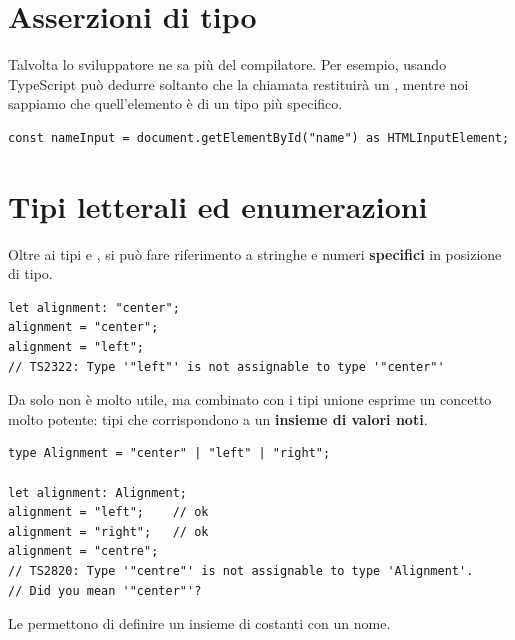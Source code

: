 \section{Asserzioni di tipo}

Talvolta lo sviluppatore ne sa più del compilatore. Per esempio, usando
 TypeScript può dedurre soltanto che la chiamata
restituirà un , mentre noi sappiamo che quell'elemento è di un
tipo più specifico.

\begin{lstlisting}[style=ts]
const nameInput = document.getElementById("name") as HTMLInputElement;
\end{lstlisting}


\section{Tipi letterali ed enumerazioni}

Oltre ai tipi  e , si può fare riferimento a stringhe
e numeri \textbf{specifici} in posizione di tipo.

\begin{lstlisting}[style=ts]
let alignment: "center";
alignment = "center";
alignment = "left";
// TS2322: Type '"left"' is not assignable to type '"center"'
\end{lstlisting}

Da solo non è molto utile, ma combinato con i tipi unione esprime un concetto
molto potente: tipi che corrispondono a un \textbf{insieme di valori noti}.

\begin{lstlisting}[style=ts]
type Alignment = "center" | "left" | "right";

let alignment: Alignment;
alignment = "left";    // ok
alignment = "right";   // ok
alignment = "centre";
// TS2820: Type '"centre"' is not assignable to type 'Alignment'.
// Did you mean '"center"'?
\end{lstlisting}

Le  permettono di definire un insieme di costanti con un
nome.


